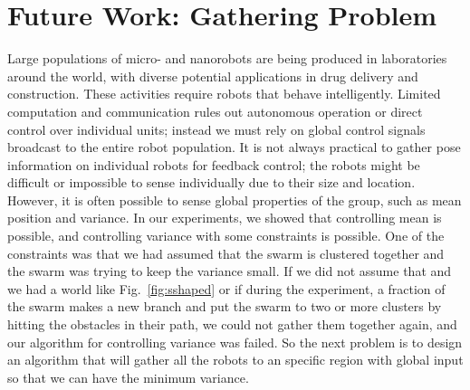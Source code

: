   \section{Future Work: Gathering Problem}
Large populations of micro- and nanorobots are being produced in laboratories around the world, with diverse potential applications in drug delivery and construction. These activities require robots that behave intelligently. Limited computation and communication rules out autonomous operation or direct control over individual units; instead we must rely on global control signals broadcast to the entire robot population. It is not always practical to gather pose information on individual robots for feedback control; the robots might be difficult or impossible to sense individually due to their size and location. 
However, it is often possible to sense global properties of the group, such as mean position and variance. In our experiments, we showed that controlling mean is possible, and controlling variance with some constraints is possible. One of the constraints was that we had assumed that the swarm is clustered together and the swarm was trying to keep the variance small. If we did not assume that and we had a world like Fig.~\ref{fig:sshaped} or if during the experiment, a fraction of the swarm makes a new branch and put the swarm to two or more clusters by hitting the obstacles in their path, we could not gather them together again, and our algorithm for controlling variance was failed. So the next problem is to design an algorithm that will gather all the robots to an specific region with global input so that we can have the minimum variance. \\

